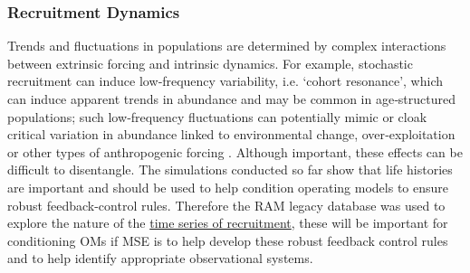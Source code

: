 \subsubsection*{Recruitment Dynamics}
Trends and fluctuations in populations are determined by complex interactions between extrinsic forcing and intrinsic dynamics. For example, stochastic recruitment can induce low‐frequency variability, i.e. ‘cohort resonance’, which can induce apparent trends in abundance and may be common in age‐structured populations; such low‐frequency fluctuations can potentially mimic or cloak critical variation in abundance linked to environmental change, over‐exploitation or other types of anthropogenic forcing \citep{oernstad2004trends}. Although important, these effects can be difficult to disentangle. The simulations conducted so far show that life histories are important and should be used to help condition operating models to ensure robust feedback-control rules. Therefore the RAM legacy database was used to explore the nature of the \href{https://drive.google.com/file/d/16WyfxnNuyOz2HGgYcScq8zIauvLuGXBG/view?usp=sharing}{time series of recruitment}, these will be important for conditioning OMs if MSE is to help develop these robust feedback control rules and to help identify appropriate observational systems.
